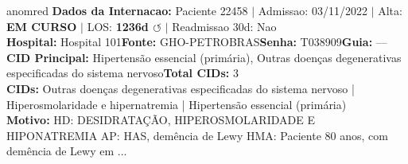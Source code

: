\documentclass[a4paper,10pt]{article}
\begin{document}
\begin{anomalycard}[Internacao 26105 | GHO-PETROBRAS | CRITICO (z=5.16)]{anomred}
\textbf{Dados da Internacao:} Paciente 22458 $\mid$ Admissao: 03/11/2022 $\mid$ Alta: \textcolor{anomorange}{\textbf{EM CURSO}} $\mid$ LOS: \textbf{1236d \textcolor{anomorange}{$\circlearrowleft$}} $\mid$ Readmissao 30d: Nao\\
\textbf{Hospital:} Hospital 101\quad\textbf{Fonte:} GHO-PETROBRAS\quad\textbf{Senha:} T038909\quad\textbf{Guia:} ---\\
\textbf{CID Principal:} {\small Hipertensão essencial (primária), Outras doenças degenerativas especificadas do sistema nervoso}\quad\textbf{Total CIDs:} 3\\

\textbf{CIDs:} {\scriptsize Outras doenças degenerativas especificadas do sistema nervoso | Hiperosmolaridade e hipernatremia | Hipertensão essencial (primária)}\\

\textbf{Motivo:} {\scriptsize HD: DESIDRATAÇÃO, HIPEROSMOLARIDADE E HIPONATREMIA  AP: HAS, demência de Lewy  HMA: Paciente 80 anos, com demência de Lewy em ...}\\


\end{anomalycard}
\end{document}
